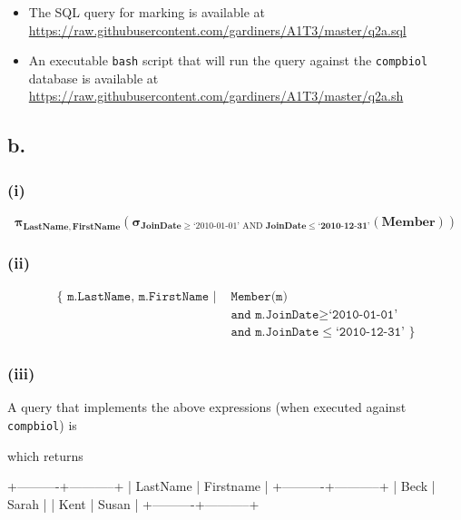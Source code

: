 \documentclass{article}
\newcommand{\select}[1]{
\boldsymbol{\sigma}_{#1}
}
\newcommand{\project}[1]{
\boldsymbol{\pi}_{#1}
}
\begin{document}
\begin{itemize}
    \item The SQL query for marking is available at \url{https://raw.githubusercontent.com/gardiners/A1T3/master/q2a.sql}
    \item An executable \texttt{bash} script that will run the query against the \texttt{compbiol} database is available at \url{https://raw.githubusercontent.com/gardiners/A1T3/master/q2a.sh}
\end{itemize}

\subsection{b.}

\subsubsection{(i)}

$$
\project{\mathbf{LastName, FirstName}}
\left(
\select{\mathbf{JoinDate} \geq \text{`2010-01-01' AND } \mathbf{JoinDate \leq \text{`2010-12-31'}}}
\left(\mathbf{Member}\right)
\right)
$$

\subsubsection{(ii)}

$$
\begin{aligned}
\{
\texttt{ m.LastName, m.FirstName } | &\texttt{ Member(m)} \\
    &\texttt{ and m.JoinDate} \geq \texttt{`2010-01-01'} \\
    &\texttt{ and m.JoinDate} \leq \texttt{`2010-12-31' }
\}
\end{aligned}
$$

\subsubsection{(iii)}

A query that implements the above expressions (when executed against \texttt{compbiol}) is 


which returns

\begin{bashinline}
+----------+-----------+
| LastName | Firstname |
+----------+-----------+
| Beck     | Sarah     |
| Kent     | Susan     |
+----------+-----------+
\end{bashinline}
\end{document}
